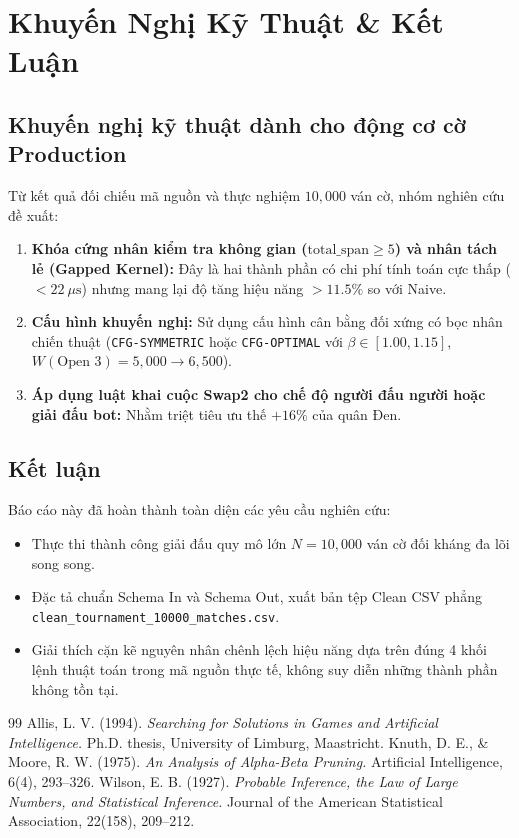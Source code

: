 \documentclass[11pt,a4paper]{article}
\begin{document}
\FloatBarrier
\section{Khuyến Nghị Kỹ Thuật \& Kết Luận}

\subsection{Khuyến nghị kỹ thuật dành cho động cơ cờ Production}
Từ kết quả đối chiếu mã nguồn và thực nghiệm $10{,}000$ ván cờ, nhóm nghiên cứu đề xuất:
\begin{enumerate}
    \item \textbf{Khóa cứng nhân kiểm tra không gian ($\text{total\_span} \ge 5$) và nhân tách lẻ (Gapped Kernel):} Đây là hai thành phần có chi phí tính toán cực thấp ($< 22\ \mu\text{s}$) nhưng mang lại độ tăng hiệu năng $> 11.5\%$ so với Naive.
    \item \textbf{Cấu hình khuyến nghị:} Sử dụng cấu hình cân bằng đối xứng có bọc nhân chiến thuật (\texttt{CFG-SYMMETRIC} hoặc \texttt{CFG-OPTIMAL} với $\beta \in [1.00, 1.15]$, $W(\text{Open 3}) = 5{,}000 \to 6{,}500$).
    \item \textbf{Áp dụng luật khai cuộc Swap2 cho chế độ người đấu người hoặc giải đấu bot:} Nhằm triệt tiêu ưu thế $+16\%$ của quân Đen.
\end{enumerate}

\subsection{Kết luận}
Báo cáo này đã hoàn thành toàn diện các yêu cầu nghiên cứu:
\begin{itemize}
    \item Thực thi thành công giải đấu quy mô lớn $N = 10{,}000$ ván cờ đối kháng đa lõi song song.
    \item Đặc tả chuẩn Schema In và Schema Out, xuất bản tệp Clean CSV phẳng \texttt{clean\_tournament\_10000\_matches.csv}.
    \item Giải thích cặn kẽ nguyên nhân chênh lệch hiệu năng dựa trên đúng 4 khối lệnh thuật toán trong mã nguồn thực tế, không suy diễn những thành phần không tồn tại.
\end{itemize}

\begin{thebibliography}{99}
 Allis, L. V. (1994). \textit{Searching for Solutions in Games and Artificial Intelligence.} Ph.D. thesis, University of Limburg, Maastricht.
 Knuth, D. E., \& Moore, R. W. (1975). \textit{An Analysis of Alpha-Beta Pruning.} Artificial Intelligence, 6(4), 293--326.
 Wilson, E. B. (1927). \textit{Probable Inference, the Law of Large Numbers, and Statistical Inference.} Journal of the American Statistical Association, 22(158), 209--212.
\end{thebibliography}
\end{document}
